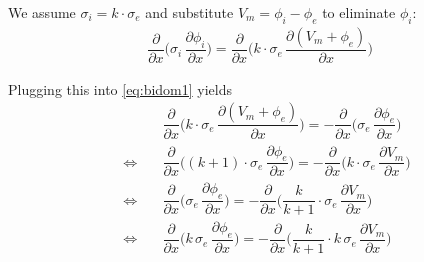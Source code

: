 We assume $\sigma_i = k\cdot \sigma_e$ and substitute $V_m = \phi_i - \phi_e$ to eliminate $\phi_i$:
\begin{equation}\label{eq:subsbidom}
  \begin{array}{lll}
    \dfrac{\partial}{\partial x} \Big(\sigma_i\,\dfrac{\partial\phi_i}{\partial x}\Big) = 
    \dfrac{\partial}{\partial x} \Big(k\cdot \sigma_e\,\dfrac{\partial(V_m + \phi_e)}{\partial x}\Big)
  \end{array}
\end{equation}

Plugging this into \eqref{eq:bidom1} yields
\begin{equation}\label{eq:subs2bidom}
  \begin{array}{lll}
    &\dfrac{\partial}{\partial x} \Big(k\cdot \sigma_e\,\dfrac{\partial(V_m + \phi_e)}{\partial x}\Big)
      = -\dfrac{\partial}{\partial x} \Big(\sigma_e\,\dfrac{\partial\phi_e}{\partial x}\Big)    \\[4mm]
    \quad\Leftrightarrow\quad & 
    \dfrac{\partial}{\partial x} \Big((k+1)\cdot \sigma_e\,\dfrac{\partial\phi_e}{\partial x}\Big) = -\dfrac{\partial}{\partial x} \Big(k\cdot \sigma_e\,\dfrac{\partial V_m}{\partial x}\Big) \\[4mm]
    \quad\Leftrightarrow\quad & 
    \dfrac{\partial}{\partial x} \Big(\sigma_e\,\dfrac{\partial\phi_e}{\partial x}\Big) = -\dfrac{\partial}{\partial x} \Big(\dfrac{k}{k+1}\cdot \sigma_e\,\dfrac{\partial V_m}{\partial x}\Big)\\[4mm]
  \quad\Leftrightarrow\quad & 
    \dfrac{\partial}{\partial x} \Big(k\,\sigma_e\,\dfrac{\partial\phi_e}{\partial x}\Big) = -\dfrac{\partial}{\partial x} \Big(\dfrac{k}{k+1}\cdot k\, \sigma_e\,\dfrac{\partial V_m}{\partial x}\Big)
  \end{array}
\end{equation}

